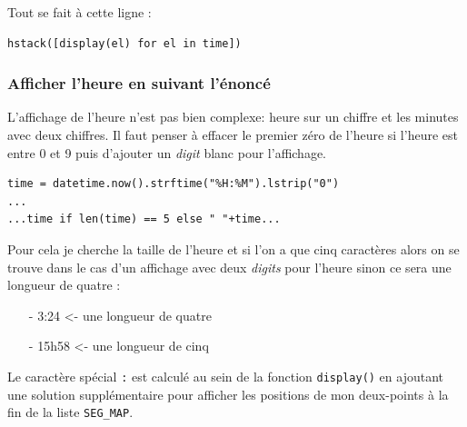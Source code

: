 Tout se fait à cette ligne :
\begin{verbatim}
hstack([display(el) for el in time])
\end{verbatim}
\medskip

\subsubsection*{\textbullet{} Afficher l'heure en suivant l'énoncé}
L'affichage de l'heure n'est pas bien complexe: heure sur un chiffre et les minutes avec deux chiffres. Il faut penser à effacer le premier zéro de l'heure si l'heure est entre 0 et 9 puis d'ajouter un \textit{digit} blanc pour l'affichage.
\begin{lstlisting}
time = datetime.now().strftime("%H:%M").lstrip("0")
...
...time if len(time) == 5 else " "+time...
\end{lstlisting}
\medskip

Pour cela je cherche la taille de l'heure et si l'on a que cinq caractères alors on se trouve dans le cas d'un affichage avec deux \textit{digits} pour l'heure sinon ce sera une longueur de quatre :
\begin{itemize}
	\item[-] 3:24 <- une longueur de quatre
	\item[-] 15h58 <- une longueur de cinq
\end{itemize}
\medskip

Le caractère spécial \og \texttt{:}\fg{} est calculé au sein de la fonction \texttt{display()} en ajoutant une solution supplémentaire pour afficher les positions de mon \og deux-points\fg{} à la fin de la liste \texttt{SEG\_MAP}.
\medskip
